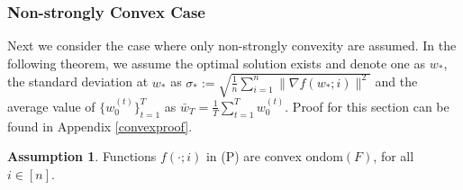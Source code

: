 \documentclass{article} %
\theoremstyle{plain}
\newtheorem{theorem}{Theorem}[section]
\theoremstyle{definition}
\newtheorem{assumption}[theorem]{Assumption}
\theoremstyle{remark}
\begin{document}


\subsubsection{Non-strongly Convex Case}
\label{section:nonstrongly}

Next we consider the case where only non-strongly convexity are assumed. In the following theorem, we assume the optimal solution exists and denote one as $w_*$, the standard deviation at $w_*$ as $\sigma_*:=\sqrt{\frac{1}{n}\sum_{i=1}^n\|\nabla f(w_*;i)\|^2}$ and the average value of $\{w^{(t)}_0\}_{t=1}^T$ as $\bar{w}_{T}=\frac{1}{T}\sum_{t=1}^{T}w^{(t)}_0$. Proof for this section can be found in Appendix \ref{convexproof}.

\begin{assumption}
\label{assumption:nonstrongly}
    Functions $f(\cdot;i)$ in (P) are convex on$\mathrm{dom}(F)$, for all $i\in[n]$.
\end{assumption}
\end{document}
